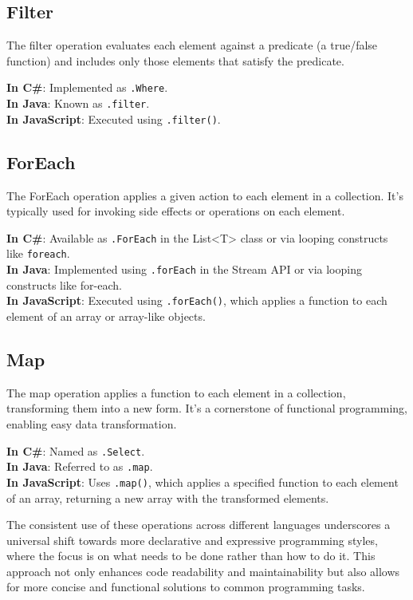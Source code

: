 \subsection*{Filter}
The filter operation evaluates each element against a predicate (a true/false function) and includes only those elements that satisfy the predicate.

\textbf{In C\#}: Implemented as \texttt{.Where}. \\
\textbf{In Java}: Known as \texttt{.filter}. \\
\textbf{In JavaScript}: Executed using \texttt{.filter()}.

\subsection*{ForEach}
The ForEach operation applies a given action to each element in a collection. It's typically used for invoking side effects or operations on each element.

\textbf{In C\#}: Available as \texttt{.ForEach} in the List<T> class or via looping constructs like \texttt{foreach}. \\
\textbf{In Java}: Implemented using \texttt{.forEach} in the Stream API or via looping constructs like for-each. \\
\textbf{In JavaScript}: Executed using \texttt{.forEach()}, which applies a function to each element of an array or array-like objects.

\subsection*{Map}
The map operation applies a function to each element in a collection, transforming them into a new form. It's a cornerstone of functional programming, enabling easy data transformation.

\textbf{In C\#}: Named as \texttt{.Select}. \\
\textbf{In Java}: Referred to as \texttt{.map}. \\
\textbf{In JavaScript}: Uses \texttt{.map()}, which applies a specified function to each element of an array, returning a new array with the transformed elements.

The consistent use of these operations across different languages underscores a universal shift towards more declarative and expressive programming styles, where the focus is on what needs to be done rather than how to do it. This approach not only enhances code readability and maintainability but also allows for more concise and functional solutions to common programming tasks.

